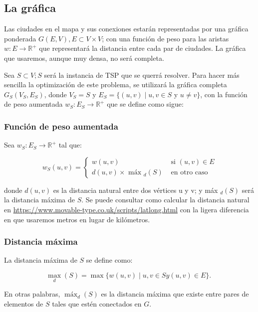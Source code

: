 \documentclass[spanish,12pt,letterpaper]{article}
\begin{document}
	\subsection{La gráfica}
	
	Las ciudades en el mapa y sus conexiones estarán representadas por una gráfica ponderada $G(E, V), E \subset V \times V$; con una función de peso para las aristas $w: E \longrightarrow \mathbb{R}^{+}$ que representará la distancia entre cada par de ciudades. La gráfica que usaremos, aunque muy densa, no será completa.
	
	Sea $S \subset V ; S$ será la instancia de TSP que se querrá resolver. Para hacer más sencilla la optimización de este problema, se utilizará la gráfica completa $G_{S}\left(V_{S}, E_{S}\right)$, donde $V_{S}=S$ y $E_{S}=\{(u, v) \mid u, v \in S$ y $u \neq v\}$, con la función de peso aumentada $w_{S}: E_{S} \longrightarrow \mathbb{R}^{+}$ que se define como sigue:
	
	\subsubsection{Función de peso aumentada}
	
	Sea $w_{S}: E_{S} \longrightarrow \mathbb{R}^{+}$ tal que:
	
	\[
	w_{S}(u, v)=\left\{
	\begin{array}{cl}
		w(u, v) & \text { si }(u, v) \in E \\
		d(u, v) \times \text { máx }_{d}(S) & \text { en otro caso }
	\end{array}
	\right.
	\]
	
	donde $d(u, v)$ es la distancia natural entre dos vértices u y v; y máx ${ }_{d}(S)$ será la distancia máxima de $S$. Se puede consultar como calcular la distancia natural en \url{https://www.movable-type.co.uk/scripts/latlong.html} con la ligera diferencia en que usaremos metros en lugar de kilómetros.
	
	\subsubsection{Distancia máxima}
	
	La distancia máxima de $S$ se define como:
	
	\[
	\operatorname{max}_{d}(S)=\operatorname{max}\{w(u, v) \mid u, v \in S y(u, v) \in E\} \text {. }
	\]
	
	En otras palabras, $\operatorname{máx}_{d}(S)$ es la distancia máxima que existe entre pares de elementos de $S$ tales que estén conectados en $G$.
\end{document}
